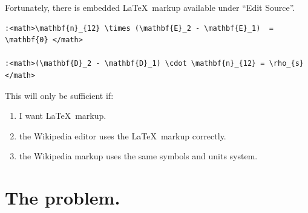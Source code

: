 \documentclass[12pt,letterpaper]{article}
\begin{document}
Fortunately, there is embedded \LaTeX\ markup available under ``Edit Source''.

\begin{verbatim}
:<math>\mathbf{n}_{12} \times (\mathbf{E}_2 - \mathbf{E}_1)  = \mathbf{0} </math>

:<math>(\mathbf{D}_2 - \mathbf{D}_1) \cdot \mathbf{n}_{12} = \rho_{s} </math>
\end{verbatim}

This will only be sufficient if:
\begin{enumerate}
\item I want \LaTeX\ markup.
\item the Wikipedia editor uses the \LaTeX\ markup correctly.
\item the Wikipedia markup uses the same symbols and units system.
\end{enumerate}

\section{The problem.}
\end{document}
